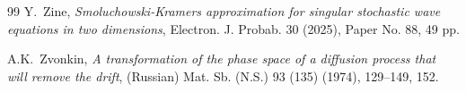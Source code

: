 \documentclass[letterpaper, 11pt,  reqno]{amsart}
\newcommand{\1}{\hspace{0.5mm}\text{I}\hspace{0.5mm}}
\numberwithin{equation}{section}
\numberwithin{theorem}{section}
\begin{document}
\begin{thebibliography}{99}
Y.~Zine, 
{\it Smoluchowski-Kramers approximation for singular stochastic wave equations in two dimensions},
 Electron. J. Probab. 30 (2025), Paper No. 88, 49 pp. 


A.K.~Zvonkin, 
{\it A transformation of the phase space of a diffusion process that will remove the drift}, 
(Russian)
Mat. Sb. (N.S.) 93 (135) (1974), 129--149, 152. 





\end{thebibliography}
\end{document}

